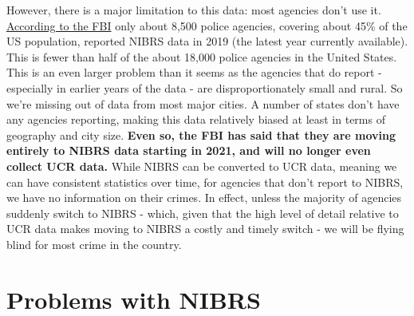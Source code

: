 \documentclass[
  12pt,
  openany]{book}
\begin{document}
However, there is a major limitation to this data: most agencies don't use it. \href{https://www.fbi.gov/news/pressrel/press-releases/fbi-releases-2019-nibrs-crime-data}{According to the FBI} only about 8,500 police agencies, covering about 45\% of the US population, reported NIBRS data in 2019 (the latest year currently available). This is fewer than half of the about 18,000 police agencies in the United States. This is an even larger problem than it seems as the agencies that do report - especially in earlier years of the data - are disproportionately small and rural. So we're missing out of data from most major cities. A number of states don't have any agencies reporting, making this data relatively biased at least in terms of geography and city size. \textbf{Even so, the FBI has said that they are moving entirely to NIBRS data starting in 2021, and will no longer even collect UCR data.} While NIBRS can be converted to UCR data, meaning we can have consistent statistics over time, for agencies that don't report to NIBRS, we have no information on their crimes. In effect, unless the majority of agencies suddenly switch to NIBRS - which, given that the high level of detail relative to UCR data makes moving to NIBRS a costly and timely switch - we will be flying blind for most crime in the country.

\section{Problems with NIBRS}\label{problems-with-nibrs}
\end{document}
